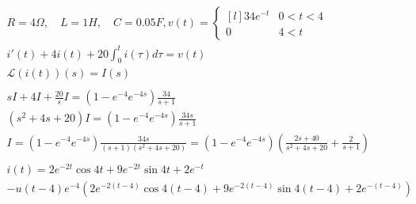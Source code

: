 \documentclass{article}
\newcommand{\paranth}[1]{\left( #1 \right)}
\newcommand{\laplace}[1]{\mathcal{L}\paranth{#1}}
\begin{document}
\begin{gather*}
	R = 4 \Omega, \quad L = 1 H, \quad C = 0.05 F, v(t) = \left\{\begin{matrix*}[l]
		34 e^{-t}	& 0 < t < 4 \\
		0			& 4 < t
	\end{matrix*}\right. \\
	i'(t) + 4 i(t) + 20 \int_0^t{i(\tau) d\tau} = v(t) \\
	\laplace{i(t)}(s) = I(s) \\ \\
	sI + 4I + \frac{20}{s} I = \paranth{1 - e^{-4} e^{-4 s}} \frac{34}{s + 1} \\
	\paranth{s^2 + 4s + 20} I = \paranth{1 - e^{-4} e^{-4 s}} \frac{34 s}{s + 1} \\
	I = \paranth{1 - e^{-4} e^{-4 s}} \frac{34 s}{(s + 1) \paranth{s^2 + 4 s + 20}} =
	\paranth{1 - e^{-4} e^{-4 s}} \paranth{\frac{2 s + 40}{s^2 + 4 s + 20} + \frac{2}{s + 1}} \\ \\
	i(t) = 2 e^{-2 t} \cos{4 t} + 9 e^{-2 t} \sin{4 t} + 2 e^{-t} \\
	- u(t - 4) e^{-4} \paranth{2 e^{-2 (t - 4)} \cos{4 (t - 4)} + 9 e^{-2 (t - 4)} \sin{4 (t - 4)} + 2 e^{-(t - 4)}}
\end{gather*}
\end{document}
